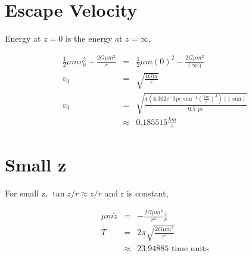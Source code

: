 \documentclass{article}
\begin{document}
\section{Escape Velocity}

Energy at $z=0$ is the energy at $z=\infty$,

\begin{eqnarray}
\frac{1}{2}\mu m v_0^2 - \frac{2G \mu m^2}{r} & = & \frac{1}{2}\mu m (0)^2 - \frac{2G \mu m^2}{(\infty)} \\
v_0 & = & \sqrt{\frac{4Gm}{r}} \\
v_0 & = & \sqrt{\frac{4(4.302e^-3 \text{pc sun}^{-1} (\frac{km}{s})^2) (1 \text{ sun})}{0.5 \text{ pc}}} \\
& \approx & 0.185515 \frac{km}{s}
\label{eq:esc}
\end{eqnarray}

\section{Small z}

For small z, $\tan{z/r} \approx z/r$ and r is constant,

\begin{eqnarray}
\mu m \ddot{z} & = &  - \frac{2G \mu m^2}{r^2} \frac{z}{r} \\
T & = & 2\pi \sqrt{\frac{2G \mu m^2}{r^3}} \\
& \approx & 23.94885 \text{  time units}
\label{eq:small}
\end{eqnarray}

%
%
%
\end{document}
